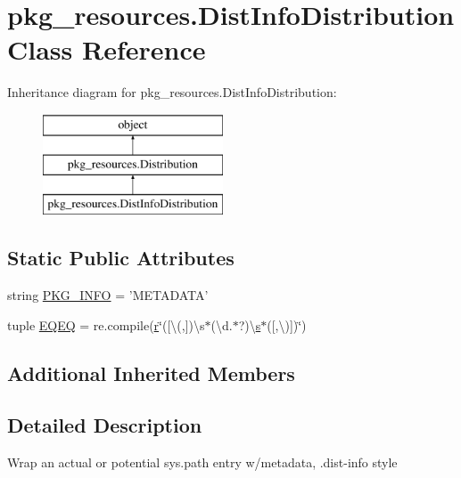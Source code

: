 \hypertarget{classpkg__resources_1_1DistInfoDistribution}{}\section{pkg\+\_\+resources.\+Dist\+Info\+Distribution Class Reference}
\label{classpkg__resources_1_1DistInfoDistribution}
Inheritance diagram for pkg\+\_\+resources.\+Dist\+Info\+Distribution\+:\begin{figure}[H]
\begin{center}
\leavevmode
\includegraphics[height=3.000000cm]{classpkg__resources_1_1DistInfoDistribution}
\end{center}
\end{figure}
\subsection*{Static Public Attributes}
\begin{DoxyCompactItemize}
\item 
string \hyperlink{classpkg__resources_1_1DistInfoDistribution_ab6da982f7c44c3f4e90ea400128f653d}{P\+K\+G\+\_\+\+I\+N\+F\+O} = 'M\+E\+T\+A\+D\+A\+T\+A'
\item 
tuple \hyperlink{classpkg__resources_1_1DistInfoDistribution_a0f8bf82f8f8b3a3a05daac595841d8a0}{E\+Q\+E\+Q} = re.\+compile(\hyperlink{indexexpr_8h_ac434fd11cc2493608d8d91424d60c17e}{r}\char`\"{}(\mbox{[}\textbackslash{}(,\mbox{]})\textbackslash{}s$\ast$(\textbackslash{}d.$\ast$?)\textbackslash{}\hyperlink{indexexpr_8h_ae024b0db549122b44c349ae28ec990dc}{s}$\ast$(\mbox{[},\textbackslash{})\mbox{]})\char`\"{})
\end{DoxyCompactItemize}
\subsection*{Additional Inherited Members}


\subsection{Detailed Description}
\begin{DoxyVerb}Wrap an actual or potential sys.path entry w/metadata, .dist-info style\end{DoxyVerb}
 

